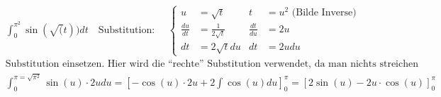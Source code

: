 \documentclass[a4paper]{article}
\begin{document}
		\begin{fmerke}
			\begin{align*}
				&\int_{0}^{\pi^2} \sin(\sqrt(t)) dt  \quad \text{Substitution: }\quad \left\{
					\begin{array}{rl|rl}
						u &= \sqrt{t} & t&=u^2 \text{ (Bilde Inverse)}\\
					\frac{du}{dt} &= \frac{1}{2\sqrt{t}} & \frac{dt}{du} &= 2u\\
						dt &= 2 \sqrt{t}du & dt &= 2udu
					\end{array} \right.\\
					&\text{Substitution einsetzen. Hier wird die ``rechte'' Substitution verwendet, da man nichts streichen kann.}\\
				&\int_{0}^{\pi=\sqrt{\pi^2}} \sin(u)\cdot 2u du = \left[ -\cos(u)\cdot 2u + 2 \int \cos(u) du \right]_0^\pi= \left[ 2 \sin(u) - 2u \cdot \cos (u) \right]_0^\pi
			\end{align*}
		\end{fmerke}
		
\end{document}
